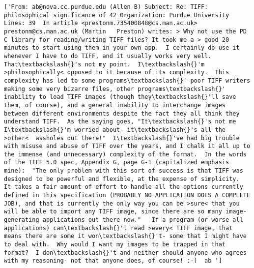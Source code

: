 \documentclass[11pt]{article}
\begin{document}
    \begin{Verbatim}[commandchars=\\\{\}]
['From: ab@nova.cc.purdue.edu (Allen B) Subject: Re: TIFF: philosophical significance of 42 Organization: Purdue University Lines: 39  In article <prestonm.735400848@cs.man.ac.uk> prestonm@cs.man.ac.uk (Martin   Preston) writes: > Why not use the PD C library for reading/writing TIFF files? It took me a > good 20 minutes to start using them in your own app.  I certainly do use it whenever I have to do TIFF, and it usually works very well.  That\textbackslash{}'s not my point.  I\textbackslash{}'m >philosophically< opposed to it because of its complexity.  This complexity has led to some programs\textbackslash{}' poor TIFF writers making some very bizarre files, other programs\textbackslash{}' inability to load TIFF images (though they\textbackslash{}'ll save them, of course), and a general inability to interchange images between different environments despite the fact they all think they understand TIFF.  As the saying goes, "It\textbackslash{}'s not me I\textbackslash{}'m worried about- it\textbackslash{}'s all the >other<  assholes out there!"  I\textbackslash{}'ve had big trouble with misuse and abuse of TIFF over the years, and I chalk it all up to the immense (and unnecessary) complexity of the format.  In the words of the TIFF 5.0 spec, Appendix G, page G-1 (capitalized emphasis mine):  "The only problem with this sort of success is that TIFF was designed to be powerful and flexible, at the expense of simplicity.  It takes a fair amount of effort to handle all the options currently defined in this specification (PROBABLY NO APPLICATION DOES A COMPLETE JOB), and that is currently the only way you can be >sure< that you will be able to import any TIFF image, since there are so many image-generating applications out there now."   If a program (or worse all applications) can\textbackslash{}'t read >every< TIFF image, that means there are some it won\textbackslash{}'t- some that I might have to deal with.  Why would I want my images to be trapped in that format?  I don\textbackslash{}'t and neither should anyone who agrees with my reasoning- not that anyone does, of course! :-)  ab ']

\end{Verbatim}
\end{document}
